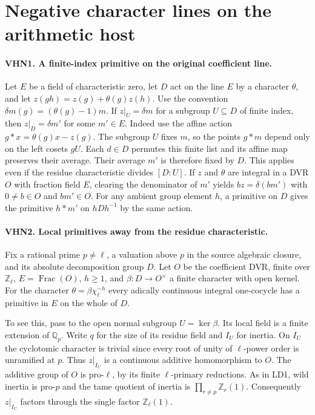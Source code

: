 \section{Negative character lines on the arithmetic host}
\label{sec:negative-host-lines}

\paragraph{VHN1. A finite-index primitive on the original coefficient line.}
\label{claim:VHN1}
Let $E$ be a field of characteristic zero, let $D$ act on the line
$E$ by a character $\theta$, and let $z(gh)=z(g)+\theta(g)z(h)$.
Use the convention $\delta m(g)=(\theta(g)-1)m$. If
$z|_U=\delta m$ for a subgroup $U\subseteq D$ of finite index,
then $z|_D=\delta m'$ for some $m'\in E$. Indeed use the affine
action $g*x=\theta(g)x-z(g)$. The subgroup $U$ fixes $m$, so the
points $g*m$ depend only on the left cosets $gU$. Each $d\in D$
permutes this finite list and its affine map preserves their average.
Their average $m'$ is therefore fixed by $D$. This applies even if
the residue characteristic divides $[D:U]$. If $z$ and $\theta$
are integral in a DVR $O$ with fraction field $E$, clearing the
denominator of $m'$ yields $b z=\delta(bm')$ with $0\ne b\in O$
and $bm'\in O$. For any ambient group element $h$, a primitive
on $D$ gives the primitive $h*m'$ on $hDh^{-1}$ by the same action.

\paragraph{VHN2. Local primitives away from the residue characteristic.}
\label{claim:VHN2}
Fix a rational prime $p\ne\ell$, a valuation above $p$ in the
source algebraic closure, and its absolute decomposition group $D$.
Let $O$ be the coefficient DVR, finite over $\mathbb Z_\ell$,
$E=\operatorname{Frac}(O)$, $h\ge1$, and $\beta:D\to O^\times$
a finite character with open kernel. For the character
$\theta=\beta\chi_\ell^{-h}$ every adically continuous integral
one-cocycle has a primitive in $E$ on the whole of $D$.

To see this, pass to the open normal subgroup $U=\ker\beta$.
Its local field is a finite extension of $\mathbb Q_p$.
Write $q$ for the size of its residue field and $I_U$ for inertia.
On $I_U$ the cyclotomic character is trivial since every root of
unity of $\ell$-power order is unramified at $p$. Thus $z|_{I_U}$
is a continuous additive homomorphism to $O$. The additive group
of $O$ is pro-$\ell$, by its finite $\ell$-primary reductions.
As in LD1, wild inertia is pro-$p$ and the tame quotient of inertia
is $\prod_{r\ne p}\mathbb Z_r(1)$. Consequently $z|_{I_U}$
factors through the single factor $\mathbb Z_\ell(1)$.

